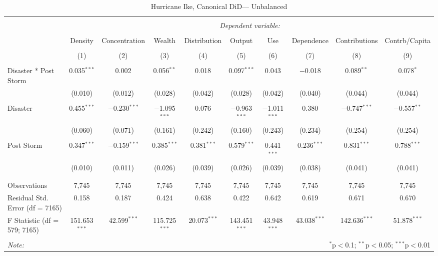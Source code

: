 
\begin{table}[!htbp] \centering 
  \caption{Hurricane Ike, Canonical DiD--- Unbalanced} 
  \label{} 
\footnotesize 
\begin{tabular}{@{\extracolsep{5pt}}lccccccccc} 
\\[-1.8ex]\hline 
\hline \\[-1.8ex] 
 & \multicolumn{9}{c}{\textit{Dependent variable:}} \\ 
\cline{2-10} 
\\[-1.8ex] & Density & Concentration & Wealth & Distribution & Output & Use & Dependence & Contributions & Contrb/Capita \\ 
\\[-1.8ex] & (1) & (2) & (3) & (4) & (5) & (6) & (7) & (8) & (9)\\ 
\hline \\[-1.8ex] 
 Disaster * Post Storm & 0.035$^{***}$ & 0.002 & 0.056$^{**}$ & 0.018 & 0.097$^{***}$ & 0.043 & $-$0.018 & 0.089$^{**}$ & 0.078$^{*}$ \\ 
  & (0.010) & (0.012) & (0.028) & (0.042) & (0.028) & (0.042) & (0.040) & (0.044) & (0.044) \\ 
  & & & & & & & & & \\ 
 Disaster & 0.455$^{***}$ & $-$0.230$^{***}$ & $-$1.095$^{***}$ & 0.076 & $-$0.963$^{***}$ & $-$1.011$^{***}$ & 0.380 & $-$0.747$^{***}$ & $-$0.557$^{**}$ \\ 
  & (0.060) & (0.071) & (0.161) & (0.242) & (0.160) & (0.243) & (0.234) & (0.254) & (0.254) \\ 
  & & & & & & & & & \\ 
 Post Storm & 0.347$^{***}$ & $-$0.159$^{***}$ & 0.385$^{***}$ & 0.381$^{***}$ & 0.579$^{***}$ & 0.441$^{***}$ & 0.236$^{***}$ & 0.831$^{***}$ & 0.788$^{***}$ \\ 
  & (0.010) & (0.011) & (0.026) & (0.039) & (0.026) & (0.039) & (0.038) & (0.041) & (0.041) \\ 
  & & & & & & & & & \\ 
\hline \\[-1.8ex] 
Observations & 7,745 & 7,745 & 7,745 & 7,745 & 7,745 & 7,745 & 7,745 & 7,745 & 7,745 \\ 
Residual Std. Error (df = 7165) & 0.158 & 0.187 & 0.424 & 0.638 & 0.422 & 0.642 & 0.619 & 0.671 & 0.670 \\ 
F Statistic (df = 579; 7165) & 151.653$^{***}$ & 42.599$^{***}$ & 115.725$^{***}$ & 20.073$^{***}$ & 143.451$^{***}$ & 43.948$^{***}$ & 43.038$^{***}$ & 142.636$^{***}$ & 51.878$^{***}$ \\ 
\hline 
\hline \\[-1.8ex] 
\textit{Note:}  & \multicolumn{9}{r}{$^{*}$p$<$0.1; $^{**}$p$<$0.05; $^{***}$p$<$0.01} \\ 
\end{tabular} 
\end{table} 
